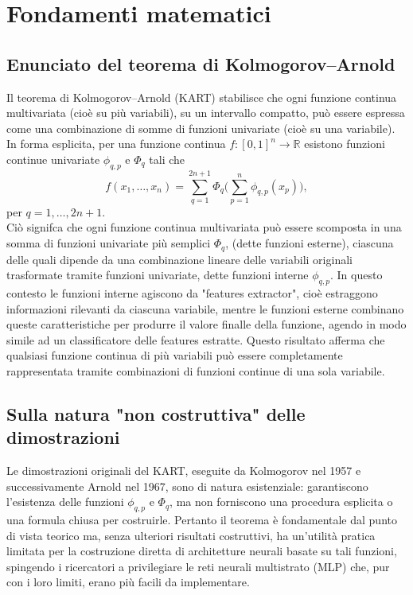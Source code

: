 \documentclass[a4paper,12pt]{report}
\begin{document}
	\section{Fondamenti matematici}
	
	\subsection{Enunciato del teorema di Kolmogorov--Arnold}
	Il teorema di Kolmogorov–Arnold (KART) stabilisce che ogni funzione continua multivariata (cioè su più variabili), su un intervallo compatto, può essere espressa come una combinazione di somme di funzioni univariate (cioè su una variabile). In forma esplicita, per una funzione continua \(f:[0,1]^n \to \mathbb{R}\) esistono funzioni continue univariate \(\phi_{q,p}\) e \(\Phi_q\) tali che
	\[
	f(x_1,\dots,x_n)=\sum_{q=1}^{2n+1}\Phi_q\!\Biggl(\sum_{p=1}^n \phi_{q,p}(x_p)\Biggr),
	\]
	per \(q=1,\dots,2n+1\). \\
	Ciò signifca che ogni funzione continua multivariata può essere scomposta in una somma di funzioni univariate più semplici \(\Phi_q\), (dette funzioni esterne), ciascuna delle quali dipende da una combinazione lineare delle variabili originali trasformate tramite funzioni univariate, dette funzioni  interne \(\phi_{q,p}\). In questo contesto le funzioni interne agiscono da "features extractor", cioè estraggono informazioni rilevanti da ciascuna variabile, mentre le funzioni esterne combinano queste caratteristiche per produrre il valore finalle della funzione, agendo in modo simile ad un classificatore delle features estratte. Questo risultato afferma che qualsiasi funzione continua di più variabili può essere completamente rappresentata tramite combinazioni di funzioni continue di una sola variabile.
	
	\subsection{Sulla natura "non costruttiva" delle dimostrazioni}
	Le dimostrazioni originali del KART, eseguite da Kolmogorov nel 1957 e successivamente Arnold nel 1967, sono di natura esistenziale: garantiscono l'esistenza delle funzioni \(\phi_{q,p}\) e \(\Phi_q\), ma non forniscono una procedura esplicita o una formula chiusa per costruirle. Pertanto il teorema è fondamentale dal punto di vista teorico ma, senza ulteriori risultati costruttivi, ha un'utilità pratica limitata per la costruzione diretta di architetture neurali basate su tali funzioni, spingendo i ricercatori a privilegiare le reti neurali multistrato (MLP) che, pur con i loro limiti, erano più facili da implementare.
	
\end{document}
